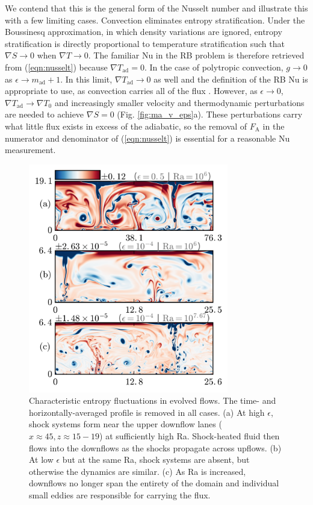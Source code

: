 \documentclass[aps, prl, twocolumn, nofootinbib, groupedaddress, amsfonts, amssymb, amsmath]{revtex4-1}
\newcommand{\grad}{\ensuremath{\nabla}}
\begin{document}
We contend that this is the general form of the Nusselt number
and illustrate this with a few limiting
cases. Convection eliminates
entropy stratification.  Under the Boussinesq approximation,
in which density variations are ignored, entropy stratification 
is directly proportional to temperature stratification
such that $\grad S \rightarrow 0$ when $\grad T \rightarrow 0$.  
The familiar Nu in the RB problem is
therefore retrieved from (\ref{eqn:nusselt}) because $\grad T_{\text{ad}} = 0$.  
In the case of polytropic convection,  $g \rightarrow 0$
as $\epsilon \rightarrow m_{\text{ad}} + 1$.
In this limit, $\grad T_{\text{ad}} \rightarrow 0$ as well and the
definition of the RB Nu is appropriate to use, as convection carries all of the
flux \cite{brandenburg&all2005}. 
However, as $\epsilon \rightarrow 0$, 
$\grad T_{\text{ad}}\rightarrow \grad T_0$ and increasingly
smaller velocity and thermodynamic perturbations are needed to 
achieve $\grad S = 0$ (Fig. \ref{fig:ma_v_eps}a).
These perturbations carry what little flux exists in 
excess of the adiabatic, so the removal of 
$F_{\text{A}}$ in the numerator and denominator of 
(\ref{eqn:nusselt}) is essential for a reasonable Nu measurement.

\begin{figure}[b]
\includegraphics[width=3.4375in]{./figs/snapshots_fig.png}
\caption{Characteristic entropy fluctuations in evolved flows. 
The time- and horizontally-averaged profile is removed in all cases.  (a) At high
$\epsilon$, shock systems form near the upper downflow lanes ($x \approx 45, z \approx 15-19$)
at sufficiently high Ra.
Shock-heated fluid then flows into the downflows as the shocks propagate across upflows.
(b) At low $\epsilon$ but at the same Ra, shock systems are absent, 
but otherwise the dynamics are similar.  (c) As Ra is increased, downflows no longer span
the entirety of the domain and individual small eddies are responsible for carrying the flux.
\label{fig:entropy_snapshots} }
\end{figure}
\end{document}
